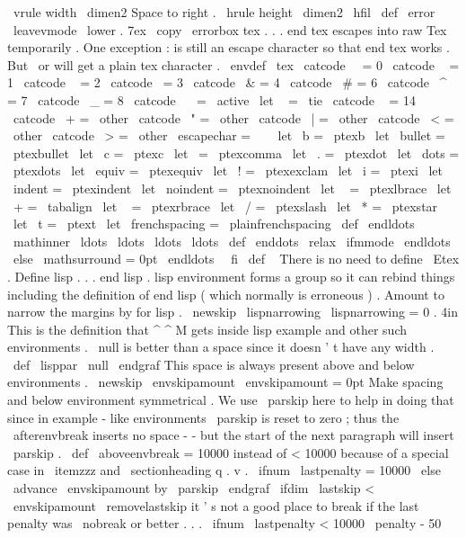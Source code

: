 {{{{{\
vrule
width
\
dimen2
}
%
Space
to
right
.
\
hrule
height
\
dimen2
}
\
hfil
}
%
\
def
\
error
{
\
leavevmode
\
lower
.
7ex
\
copy
\
errorbox
}
%
tex
.
.
.
end
tex
escapes
into
raw
Tex
temporarily
.
%
One
exception
:
is
still
an
escape
character
so
that
end
tex
works
.
%
But
\
or
will
get
a
plain
tex
character
.
\
envdef
\
tex
{
%
\
catcode
\
\
=
0
\
catcode
\
{
=
1
\
catcode
\
}
=
2
\
catcode
\
=
3
\
catcode
\
&
=
4
\
catcode
\
#
=
6
\
catcode
\
^
=
7
\
catcode
\
_
=
8
\
catcode
\
~
=
\
active
\
let
~
=
\
tie
\
catcode
\
%
=
14
\
catcode
\
+
=
\
other
\
catcode
\
"
=
\
other
\
catcode
\
|
=
\
other
\
catcode
\
<
=
\
other
\
catcode
\
>
=
\
other
\
escapechar
=
\
\
%
\
let
\
b
=
\
ptexb
\
let
\
bullet
=
\
ptexbullet
\
let
\
c
=
\
ptexc
\
let
\
=
\
ptexcomma
\
let
\
.
=
\
ptexdot
\
let
\
dots
=
\
ptexdots
\
let
\
equiv
=
\
ptexequiv
\
let
\
!
=
\
ptexexclam
\
let
\
i
=
\
ptexi
\
let
\
indent
=
\
ptexindent
\
let
\
noindent
=
\
ptexnoindent
\
let
\
{
=
\
ptexlbrace
\
let
\
+
=
\
tabalign
\
let
\
}
=
\
ptexrbrace
\
let
\
/
=
\
ptexslash
\
let
\
*
=
\
ptexstar
\
let
\
t
=
\
ptext
\
let
\
frenchspacing
=
\
plainfrenchspacing
%
\
def
\
endldots
{
\
mathinner
{
\
ldots
\
ldots
\
ldots
\
ldots
}
}
%
\
def
\
enddots
{
\
relax
\
ifmmode
\
endldots
\
else
\
mathsurround
=
0pt
\
endldots
\
\
fi
}
%
\
def
\
{
}
%
}
%
There
is
no
need
to
define
\
Etex
.
%
Define
lisp
.
.
.
end
lisp
.
%
lisp
environment
forms
a
group
so
it
can
rebind
things
%
including
the
definition
of
end
lisp
(
which
normally
is
erroneous
)
.
%
Amount
to
narrow
the
margins
by
for
lisp
.
\
newskip
\
lispnarrowing
\
lispnarrowing
=
0
.
4in
%
This
is
the
definition
that
^
^
M
gets
inside
lisp
example
and
other
%
such
environments
.
\
null
is
better
than
a
space
since
it
doesn
'
t
%
have
any
width
.
\
def
\
lisppar
{
\
null
\
endgraf
}
%
This
space
is
always
present
above
and
below
environments
.
\
newskip
\
envskipamount
\
envskipamount
=
0pt
%
Make
spacing
and
below
environment
symmetrical
.
We
use
\
parskip
here
%
to
help
in
doing
that
since
in
example
-
like
environments
\
parskip
%
is
reset
to
zero
;
thus
the
\
afterenvbreak
inserts
no
space
-
-
but
the
%
start
of
the
next
paragraph
will
insert
\
parskip
.
%
\
def
\
aboveenvbreak
{
{
%
%
=
10000
instead
of
<
10000
because
of
a
special
case
in
\
itemzzz
and
%
\
sectionheading
q
.
v
.
\
ifnum
\
lastpenalty
=
10000
\
else
\
advance
\
envskipamount
by
\
parskip
\
endgraf
\
ifdim
\
lastskip
<
\
envskipamount
\
removelastskip
%
it
'
s
not
a
good
place
to
break
if
the
last
penalty
was
\
nobreak
%
or
better
.
.
.
\
ifnum
\
lastpenalty
<
10000
\
penalty
-
50
}}}}
